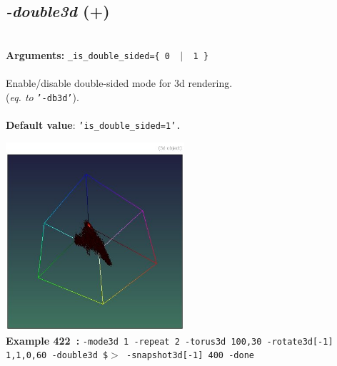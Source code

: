 \documentclass[a4paper,11pt,twoside]{book}
\begin{document}
\subsection{\emph{-double3d} (+)}\vspace*{-0.5em}
~\\\textbf{Arguments: } 
{\small \texttt{\_is\_double\_sided=\{ 0 ~$|$~ 1 \}}}\\~\\
Enable/disable double-sided mode for 3d rendering.
~\\(\emph{eq. to} {\small \texttt{'-db3d'}}).
~\\~\\\textbf{Default value}: {\small \texttt{'is\_double\_sided=1'.}}
\begin{center}\includegraphics[keepaspectratio=true,height=7cm,width=\textwidth]{img/gmic_def422.jpg}\\
{\footnotesize \textbf{Example 422~:} \texttt{-mode3d 1 -repeat 2 -torus3d 100,30 -rotate3d[-1] 1,1,0,60 -double3d \$$>$ -snapshot3d[-1] 400 -done}}
\end{center}
\end{document}
